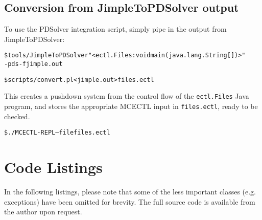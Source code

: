 \documentclass[11pt]{article}
\theoremstyle{definition}
\begin{document}
\subsection{Conversion from JimpleToPDSolver output}

To use the PDSolver integration script, simply pipe in the output from JimpleToPDSolver:
\begin{alltt}
\$ tools/JimpleToPDSolver "<ectl.Files: void main(java.lang.String[])>" 
                         -pds -f jimple.out

\$ scripts/convert.pl < jimple.out > files.ectl
\end{alltt}

This creates a pushdown system from the control flow of the \texttt{ectl.Files}
Java program, and stores the appropriate MCECTL input in \texttt{files.ectl},
ready to be checked.

\begin{alltt}
\$ ./MCECTL-REPL --file files.ectl
\end{alltt}




\section{Code Listings}

In the following listings, please note that some of the less important classes
(e.g. exceptions) have been omitted for brevity. The full source code is
available from the author upon request.

\end{document}
